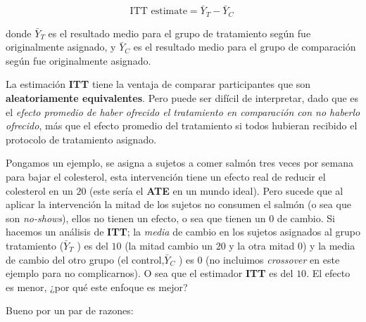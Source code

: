 \documentclass[
  letterpaper,
  DIV=11,
  numbers=noendperiod,
  oneside]{scrreprt}
\begin{document}
\[ \text{ITT estimate} = \bar{Y}_T - \bar{Y}_C \ \]

donde \(\bar{Y}_T\) es el resultado medio para el grupo de tratamiento
según fue originalmente asignado, y \(\bar{Y}_C\) es el resultado medio
para el grupo de comparación según fue originalmente asignado.

La estimación \textbf{ITT} tiene la ventaja de comparar participantes
que son \textbf{aleatoriamente equivalentes}. Pero puede ser difícil de
interpretar, dado que es el \emph{efecto promedio de haber ofrecido el
tratamiento en comparación con no haberlo ofrecido}, más que el efecto
promedio del tratamiento si todos hubieran recibido el protocolo de
tratamiento asignado.

Pongamos un ejemplo, se asigna a sujetos a comer salmón tres veces por
semana para bajar el colesterol, esta intervención tiene un efecto real
de reducir el colesterol en un \(20%
\) (este sería el \textbf{ATE} en un mundo ideal). Pero sucede que al
aplicar la intervención la mitad de los sujetos no consumen el salmón (o
sea que son \emph{no-shows}), ellos no tienen un efecto, o sea que
tienen un \(0%
\) de cambio. Si hacemos un análisis de \textbf{ITT}; la \emph{media} de
cambio en los sujetos asignados al grupo tratamiento (\(\bar{Y}_T\) ) es
del \(10%
\) (la mitad cambio un \(20%
\) y la otra mitad \(0%
\)) y la media de cambio del otro grupo (el control,\(\bar{Y}_C\) ) es
\(0%
\) (no incluimos \emph{crossover} en este ejemplo para no complicarnos).
O sea que el estimador \textbf{ITT} es del \(10%
\). El efecto es menor, ¿por qué este enfoque es mejor?

Bueno por un par de razones:
\end{document}
